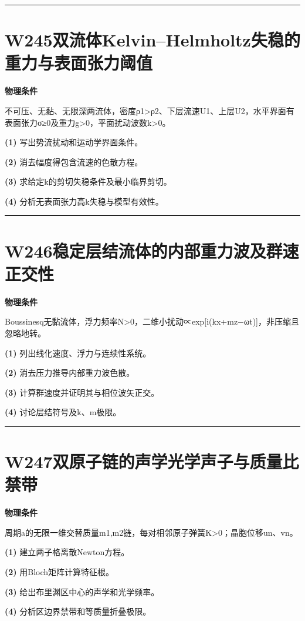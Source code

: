 \documentclass[UTF8,a4paper,11pt,oneside,openany]{ctexbook}
\begin{document}
\par\bigskip\hrule\bigskip
\section*{W245\quad 双流体Kelvin–Helmholtz失稳的重力与表面张力阈值}
\textbf{物理条件}\par 不可压、无黏、无限深两流体，密度ρ1>ρ2、下层流速U1、上层U2，水平界面有表面张力σ≥0及重力g>0，平面扰动波数k>0。
\par\noindent\textbf{(1)} 写出势流扰动和运动学界面条件。
\par\noindent\textbf{(2)} 消去幅度得包含流速的色散方程。
\par\noindent\textbf{(3)} 求给定k的剪切失稳条件及最小临界剪切。
\par\noindent\textbf{(4)} 分析无表面张力高k失稳与模型有效性。

\par\bigskip\hrule\bigskip
\section*{W246\quad 稳定层结流体的内部重力波及群速正交性}
\textbf{物理条件}\par Boussinesq无黏流体，浮力频率N>0，二维小扰动∝exp[i(kx+mz−ωt)]，非压缩且忽略地转。
\par\noindent\textbf{(1)} 列出线化速度、浮力与连续性系统。
\par\noindent\textbf{(2)} 消去压力推导内部重力波色散。
\par\noindent\textbf{(3)} 计算群速度并证明其与相位波矢正交。
\par\noindent\textbf{(4)} 讨论层结符号及k、m极限。

\par\bigskip\hrule\bigskip
\section*{W247\quad 双原子链的声学光学声子与质量比禁带}
\textbf{物理条件}\par 周期a的无限一维交替质量m1,m2链，每对相邻原子弹簧K>0；晶胞位移un、vn。
\par\noindent\textbf{(1)} 建立两子格离散Newton方程。
\par\noindent\textbf{(2)} 用Bloch矩阵计算特征根。
\par\noindent\textbf{(3)} 给出布里渊区中心的声学和光学频率。
\par\noindent\textbf{(4)} 分析区边界禁带和等质量折叠极限。
\end{document}

